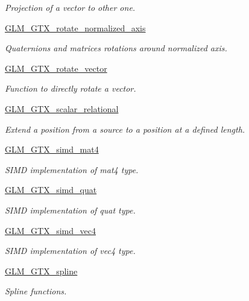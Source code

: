 \begin{DoxyCompactItemize}
\begin{DoxyCompactList}\small\item\em Projection of a vector to other one. \end{DoxyCompactList}\item 
\hyperlink{group__gtx__rotate__normalized__axis}{G\-L\-M\-\_\-\-G\-T\-X\-\_\-rotate\-\_\-normalized\-\_\-axis}
\begin{DoxyCompactList}\small\item\em Quaternions and matrices rotations around normalized axis. \end{DoxyCompactList}\item 
\hyperlink{group__gtx__rotate__vector}{G\-L\-M\-\_\-\-G\-T\-X\-\_\-rotate\-\_\-vector}
\begin{DoxyCompactList}\small\item\em Function to directly rotate a vector. \end{DoxyCompactList}\item 
\hyperlink{group__gtx__scalar__relational}{G\-L\-M\-\_\-\-G\-T\-X\-\_\-scalar\-\_\-relational}
\begin{DoxyCompactList}\small\item\em Extend a position from a source to a position at a defined length. \end{DoxyCompactList}\item 
\hyperlink{group__gtx__simd__mat4}{G\-L\-M\-\_\-\-G\-T\-X\-\_\-simd\-\_\-mat4}
\begin{DoxyCompactList}\small\item\em S\-I\-M\-D implementation of mat4 type. \end{DoxyCompactList}\item 
\hyperlink{group__gtx__simd__quat}{G\-L\-M\-\_\-\-G\-T\-X\-\_\-simd\-\_\-quat}
\begin{DoxyCompactList}\small\item\em S\-I\-M\-D implementation of quat type. \end{DoxyCompactList}\item 
\hyperlink{group__gtx__simd__vec4}{G\-L\-M\-\_\-\-G\-T\-X\-\_\-simd\-\_\-vec4}
\begin{DoxyCompactList}\small\item\em S\-I\-M\-D implementation of vec4 type. \end{DoxyCompactList}\item 
\hyperlink{group__gtx__spline}{G\-L\-M\-\_\-\-G\-T\-X\-\_\-spline}
\begin{DoxyCompactList}\small\item\em Spline functions. \end{DoxyCompactList}\item 

\end{DoxyCompactItemize}
